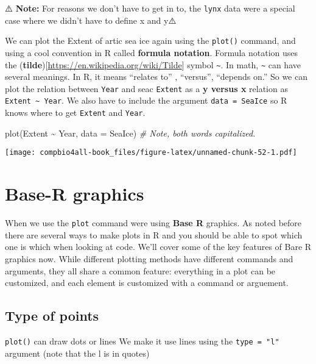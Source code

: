 \documentclass[
]{book}
\newenvironment{Shaded}{\begin{snugshade}}{\end{snugshade}}
\newcommand{\AttributeTok}[1]{\textcolor[rgb]{0.77,0.63,0.00}{#1}}
\newcommand{\CommentTok}[1]{\textcolor[rgb]{0.56,0.35,0.01}{\textit{#1}}}
\newcommand{\FunctionTok}[1]{\textcolor[rgb]{0.00,0.00,0.00}{#1}}
\newcommand{\NormalTok}[1]{#1}
\newcommand{\SpecialCharTok}[1]{\textcolor[rgb]{0.00,0.00,0.00}{#1}}
\begin{document}
⚠️ \textbf{Note:} For reasons we don't have to get in to, the \texttt{lynx} data were a special case where we didn't have to define x and y⚠️

We can plot the Extent of artic sea ice again using the \texttt{plot()} command, and using a cool convention in R called \textbf{formula notation}. Formula notation uses the (\textbf{tilde}){[}\url{https://en.wikipedia.org/wiki/Tilde}{]} symbol \texttt{\textasciitilde{}}. In math, \texttt{\textasciitilde{}} can have several meanings. In R, it means ``relates to'' , ``versus'', ``depends on.'' So we can plot the relation between \texttt{Year} and seac \texttt{Extent} as a \textbf{y versus x} relation as \texttt{Extent\ \textasciitilde{}\ Year}. We also have to include the argument \texttt{data\ =\ SeaIce} so R knows where to get \texttt{Extent} and \texttt{Year}.

\begin{Shaded}
\begin{Highlighting}[]
\FunctionTok{plot}\NormalTok{(Extent }\SpecialCharTok{\textasciitilde{}}\NormalTok{ Year, }\AttributeTok{data =}\NormalTok{ SeaIce)  }\CommentTok{\# Note, both words capitalized.}
\end{Highlighting}
\end{Shaded}

\texttt{[image: compbio4all-book\_files/figure-latex/unnamed-chunk-52-1.pdf]}

\hypertarget{base-r-graphics}{%
\section{Base-R graphics}\label{base-r-graphics}}

When we use the \texttt{plot} command were using \textbf{Base R} graphics. As noted before there are several ways to make plots in R and you should be able to spot which one is which when looking at code. We'll cover some of the key features of Bare R graphics now. While different plotting methods have different commands and arguments, they all share a common feature: everything in a plot can be customized, and each element is customized with a command or arguement.

\hypertarget{type-of-points}{%
\subsection{Type of points}\label{type-of-points}}

\texttt{plot()} can draw dots or lines We make it use lines using the \texttt{type\ =\ "l"} argument (note that the l is in quotes)
\end{document}
